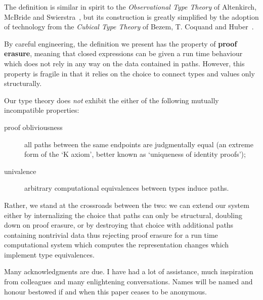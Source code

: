 \documentclass{sigplanconf}
\begin{document}
The definition is similar in spirit to the \emph{Observational
Type Theory} of Altenkirch, McBride and
Swierstra~\cite{DBLP:conf/plpv/AltenkirchMS07},
but its construction is greatly simplified by the adoption of
technology from the \emph{Cubical Type Theory} of Bezem, T. Coquand
and Huber~\cite{DBLP:conf/types/BezemCH13}.

By careful engineering, the definition we present has the property
of \textbf{proof erasure}, meaning that closed expressions can be
given a run time behaviour which does not rely in any way on the
data contained in paths. However, this property is
fragile in that it relies on the choice to connect types and
values only structurally.

Our type theory does \emph{not} exhibit the either of the following
mutually incompatible properties:
\begin{description}
\item[proof obliviousness] all paths between the same endpoints are
  judgmentally equal (an extreme form of the `K axiom', better known
  as `uniqueness of identity proofs');
\item[univalence] arbitrary computational equivalences between types induce paths.
\end{description}
Rather, we stand at the crossroads between the two: we can extend our
system either by internalizing the choice that paths can only be
structural, doubling down on proof erasure, or by destroying that
choice with additional paths containing nontrivial data thus
rejecting proof erasure for a run time computational system which
computes the representation changes which implement type equivalences.


%

\acks

Many acknowledgments are due. I have had a lot of assistance, much
inspiration from colleagues and many enlightening conversations. Names
will be named and honour bestowed if and when this paper ceases to be
anonymous.







%
%
\end{document}
